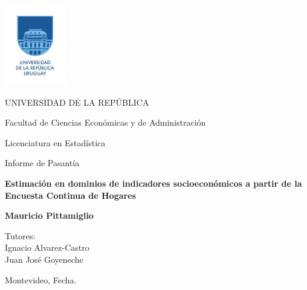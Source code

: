\documentclass[12pt,twoside,spanish,a4paper]{book}\usepackage[]{graphicx}\usepackage[]{color}
\begin{document}

\thispagestyle{empty}

\begin{center}

\includegraphics[width=0.20\textwidth]{img/udelar_logo.jpg}



UNIVERSIDAD DE LA REPÚBLICA

Facultad de Ciencias Económicas y de Administración

Licenciatura en Estadística

Informe de Pasantía

\vspace{2.5cm}


\textbf{\large Estimación en dominios de indicadores socioeconómicos a partir de la Encuesta Continua de Hogares}

\vspace{1.5 cm}

\textbf{Mauricio Pittamiglio}


\end{center}


\vspace{2cm}

\noindent Tutores:\\
\noindent Ignacio Alvarez-Castro\\
\noindent Juan José Goyeneche\\


\vspace{1cm}

\begin{center}

\noindent Montevideo, Fecha.

\end{center}


\tableofcontents

\end{document}
